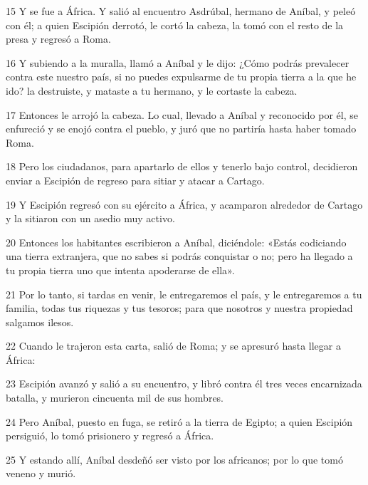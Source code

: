 \par 15 Y se fue a África. Y salió al encuentro Asdrúbal, hermano de Aníbal, y peleó con él; a quien Escipión derrotó, le cortó la cabeza, la tomó con el resto de la presa y regresó a Roma.

\par 16 Y subiendo a la muralla, llamó a Aníbal y le dijo: ¿Cómo podrás prevalecer contra este nuestro país, si no puedes expulsarme de tu propia tierra a la que he ido? la destruiste, y mataste a tu hermano, y le cortaste la cabeza.

\par 17 Entonces le arrojó la cabeza. Lo cual, llevado a Aníbal y reconocido por él, se enfureció y se enojó contra el pueblo, y juró que no partiría hasta haber tomado Roma.

\par 18 Pero los ciudadanos, para apartarlo de ellos y tenerlo bajo control, decidieron enviar a Escipión de regreso para sitiar y atacar a Cartago.

\par 19 Y Escipión regresó con su ejército a África, y acamparon alrededor de Cartago y la sitiaron con un asedio muy activo.

\par 20 Entonces los habitantes escribieron a Aníbal, diciéndole: «Estás codiciando una tierra extranjera, que no sabes si podrás conquistar o no; pero ha llegado a tu propia tierra uno que intenta apoderarse de ella».

\par 21 Por lo tanto, si tardas en venir, le entregaremos el país, y le entregaremos a tu familia, todas tus riquezas y tus tesoros; para que nosotros y nuestra propiedad salgamos ilesos.

\par 22 Cuando le trajeron esta carta, salió de Roma; y se apresuró hasta llegar a África:

\par 23 Escipión avanzó y salió a su encuentro, y libró contra él tres veces encarnizada batalla, y murieron cincuenta mil de sus hombres.

\par 24 Pero Aníbal, puesto en fuga, se retiró a la tierra de Egipto; a quien Escipión persiguió, lo tomó prisionero y regresó a África.

\par 25 Y estando allí, Aníbal desdeñó ser visto por los africanos; por lo que tomó veneno y murió.


